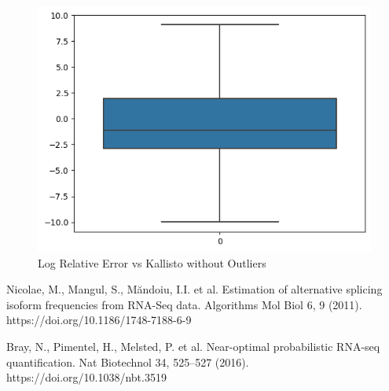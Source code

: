 \documentclass{article}
\begin{document}
\begin{figure}[H]
    \centering
      \includegraphics[width=0.8\linewidth]{./images/normal.png}
  \caption{Log Relative Error vs Kallisto without Outliers}\label{figure2b}%
\end{figure}




\clearpage
\begin{thebibliography}{9}
    Nicolae, M., Mangul, S., Măndoiu, I.I. et al. Estimation of alternative splicing isoform frequencies from RNA-Seq data. Algorithms Mol Biol 6, 9 (2011). https://doi.org/10.1186/1748-7188-6-9

    Bray, N., Pimentel, H., Melsted, P. et al. Near-optimal probabilistic RNA-seq quantification. Nat Biotechnol 34, 525–527 (2016). https://doi.org/10.1038/nbt.3519
\end{thebibliography}
\end{document}
